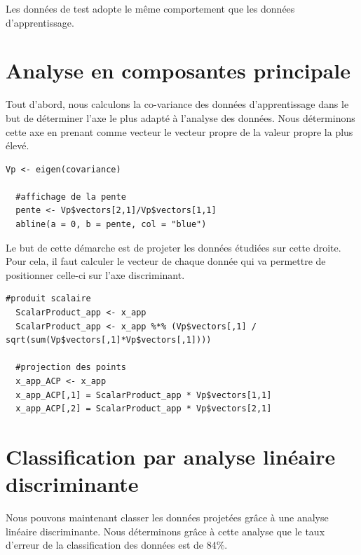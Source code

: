\documentclass[a4paper,11pt]{article}
\begin{document}
  Les données de test adopte le même comportement que les données d'apprentissage.
  
  \section{Analyse en composantes principale}
  
  Tout d'abord, nous calculons la co-variance des données d'apprentissage dans le but de déterminer
  l'axe le plus adapté à l'analyse des données. Nous déterminons cette axe en prenant comme vecteur
  le vecteur propre de la valeur propre la plus élevé.\\
  
  \begin{lstlisting}[caption=Calcule de l'axe discriminant]
  Vp <- eigen(covariance)

  #affichage de la pente
  pente <- Vp$vectors[2,1]/Vp$vectors[1,1]
  abline(a = 0, b = pente, col = "blue")
  \end{lstlisting}

  Le but de cette démarche est de projeter les données étudiées sur cette droite. Pour cela, il
  faut calculer le vecteur de chaque donnée qui va permettre de positionner celle-ci sur l'axe 
  discriminant.\\
  
  \begin{lstlisting}[caption=Projection des données d'apprentissage sur l'axe discriminant]
  #produit scalaire
  ScalarProduct_app <- x_app
  ScalarProduct_app <- x_app %*% (Vp$vectors[,1] / sqrt(sum(Vp$vectors[,1]*Vp$vectors[,1])))

  #projection des points
  x_app_ACP <- x_app
  x_app_ACP[,1] = ScalarProduct_app * Vp$vectors[1,1]
  x_app_ACP[,2] = ScalarProduct_app * Vp$vectors[2,1]
  \end{lstlisting}
  
  \section{Classification par analyse linéaire discriminante}
  
  Nous pouvons maintenant classer les données projetées grâce à une analyse linéaire discriminante. Nous 
  déterminons grâce à cette analyse que le taux d'erreur de la classification des données est de 84\%.
  
\end{document}
